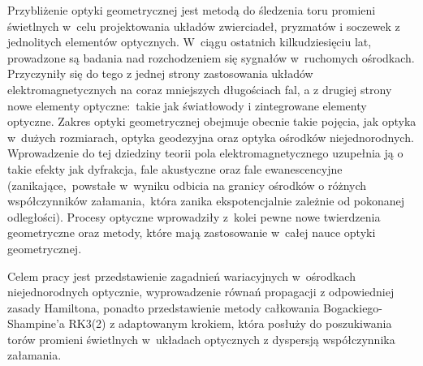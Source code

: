 \quad \quad Przybliżenie optyki geometrycznej jest metodą do śledzenia toru promieni świetlnych w~celu projektowania układów zwierciadeł, pryzmatów i soczewek z jednolitych elementów optycznych. W~ciągu ostatnich kilkudziesięciu lat, prowadzone są badania nad rozchodzeniem się sygnałów w~ruchomych ośrodkach. Przyczyniły się do tego z jednej strony zastosowania układów elektromagnetycznych na coraz mniejszych długościach fal, a z drugiej strony nowe elementy optyczne:~takie jak światłowody i zintegrowane elementy optyczne. Zakres optyki geometrycznej obejmuje obecnie takie pojęcia, jak optyka w~dużych rozmiarach, optyka geodezyjna oraz optyka ośrodków niejednorodnych. Wprowadzenie do tej dziedziny teorii pola elektromagnetycznego uzupełnia ją o takie efekty jak dyfrakcja, fale akustyczne oraz fale ewanescencyjne (zanikające,~powstałe w~wyniku odbicia na granicy ośrodków o różnych współczynników załamania,~która zanika ekspotencjalnie zależnie od pokonanej odległości). Procesy optyczne wprowadziły z~kolei pewne nowe twierdzenia geometryczne oraz metody, które mają zastosowanie w~całej nauce optyki geometrycznej.

Celem pracy jest przedstawienie zagadnień wariacyjnych w~ośrodkach niejednorodnych op\-ty\-cznie, wyprowadzenie równań propagacji z odpowiedniej zasady Hamiltona, ponadto przedstawienie metody całkowania Bogackiego-Shampine'a RK3(2) z adaptowanym krokiem, która posłuży do poszukiwania torów promieni świetlnych w~układach optycznych z dyspersją współczynnika załamania.